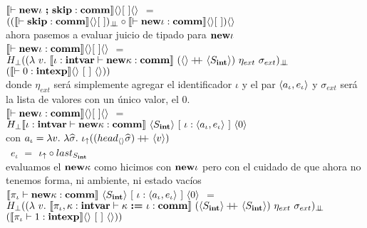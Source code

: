 \noindent
$\semBrcks{\vdash \cseq{\cnew \iota \ }{ \ \cskip} : \commt}\emptyshape\emptyenv\emptystate$ $=$\\
\indent \indent \indent \indent \indent \indent 
$((\llbracket \vdash \textbf{skip} : \textbf{comm} \rrbracket\langle  \rangle[ \ ])_{\bot \!\!\! \bot}
\circ 
\llbracket \vdash \textbf{new} \iota : \textbf{comm} \rrbracket\langle  \rangle[ \ ]) \langle  \rangle$\\

ahora pasemos a evaluar juicio de tipado para $\textbf{new} \iota$\\

\noindent
$\llbracket \vdash \textbf{new} \iota : \textbf{comm} \rrbracket\langle  \rangle[ \ ]\langle  \rangle$
$=$ \\ \indent \indent
$H_{\bot} ((\lambda \ v . \ \semBrcks{\iota:\intvar \vdash \cnew \kappa : \commt}
		\ (\emptyshape \concat\lrangles{S_\intt}) \ \eta_{ext} \ \sigma_{ext})_{\dbot}$
\\ \indent \indent  \indent  \indent  \indent \indent  \indent
\indent \indent \indent \indent \indent \indent \indent
\indent \indent \indent
$(\semBrcks{\vdash 0 : \intexp}\emptyshape \ \emptyenv \ \emptystate))$\\

donde $\eta_{ext}$ ser\'a simplemente agregar el identificador $\iota$ y el
par $\langle a_\iota,e_\iota \rangle$ y $\sigma_{ext}$ ser\'a la lista de valores
con un \'unico valor, el $0$.\\

\noindent
$\llbracket \vdash \textbf{new} \iota : \textbf{comm} \rrbracket\langle  \rangle[ \ ]\langle  \rangle$
$=$
$H_{\bot} \semBrcks{\iota:\intvar \vdash \cnew \kappa : \commt}
				    \ \lrangles{S_\intt} \ 
		  	        [ \ \iota : \lrangles{a_\iota,e_\iota} \ ] \ \lrangles{0}$\\

con $a_\iota = \lambda v. \ \lambda \widehat{\sigma} . \ \iota_{\uparrow} 
				((head_{\langle  \rangle} \widehat{\sigma}) +\kern-1.3ex+\kern0.8ex \langle v \rangle)$\\
\indent \indent \ 
$e_\iota$ $=$ $ \iota_{\uparrow} \circ last_{S_{\textbf{int}}}$\\

evaluamos el $\textbf{new} \kappa$ como hicimos con $\textbf{new} \iota$ pero con el cuidado
de que ahora no tenemos forma, ni ambiente, ni estado vac\'ios\\

\noindent
$\semBrcks{\pi_\iota \vdash \cnew \kappa : \commt}
	\ \lrangles{S_\intt} \ 
	[ \ \iota : \lrangles{a_\iota,e_\iota} \ ] \ \lrangles{0}$ $=$ \\
\indent \indent
$H_{\bot} ((\lambda \ v . \ \semBrcks{\pi_\iota,\kappa:\intvar \vdash \assig{\kappa}{\iota}: \commt}
		\ (\lrangles{S_\intt} \concat\lrangles{S_\intt}) \ \eta_{ext} \ \sigma_{ext})_{\dbot}$
\\ \indent \indent  \indent  \indent  \indent \indent  \indent
\indent \indent \indent \indent \indent \indent \indent
\indent \indent \indent
$(\llbracket \pi_\iota \vdash 1 : \textbf{intexp} \rrbracket\langle  \rangle \ [ \ ] \ \langle  \rangle))$\\

